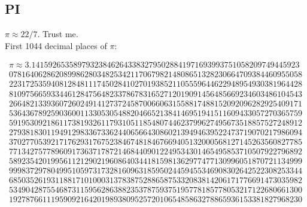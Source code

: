 \subsection{PI}

$\pi \approx 22/7$. Trust me.\\
\hfill \break
First 1044 decimal places of $\pi$:

\begin{align*}
\pi \approx 3.1415926535897932384626433832795028841971693993751058209749445923 \\
0781640628620899862803482534211706798214808651328230664709384460955058 \\
2231725359408128481117450284102701938521105559644622948954930381964428 \\
8109756659334461284756482337867831652712019091456485669234603486104543 \\
2664821339360726024914127372458700660631558817488152092096282925409171 \\
5364367892590360011330530548820466521384146951941511609433057270365759 \\
5919530921861173819326117931051185480744623799627495673518857527248912 \\
2793818301194912983367336244065664308602139494639522473719070217986094 \\
3702770539217176293176752384674818467669405132000568127145263560827785 \\
7713427577896091736371787214684409012249534301465495853710507922796892 \\
5892354201995611212902196086403441815981362977477130996051870721134999 \\
9998372978049951059731732816096318595024459455346908302642522308253344 \\
6850352619311881710100031378387528865875332083814206171776691473035982 \\
5349042875546873115956286388235378759375195778185778053217122680661300 \\
1927876611195909216420198938095257201065485863278865936153381827968230
\end{align*}